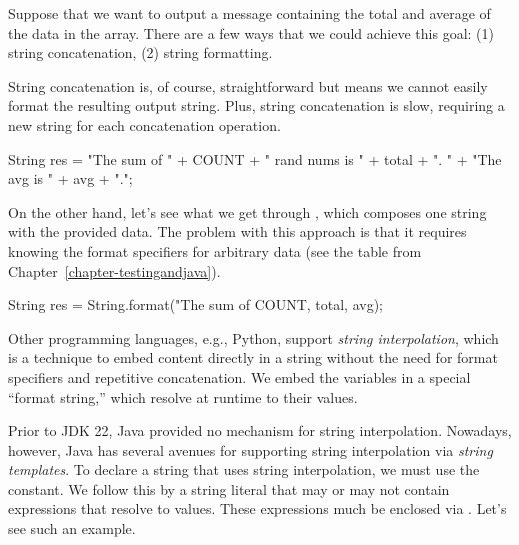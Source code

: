 Suppose that we want to output a message containing the total and average of the data in the  array. There are a few ways that we could achieve this goal: (1) string concatenation, (2) string formatting.

String concatenation is, of course, straightforward but means we cannot easily format the resulting output string. Plus, string concatenation is slow, requiring a new string for each concatenation operation.

\begin{verbnobox}[\small]
String res = "The sum of " + COUNT + " rand nums is " + total + ". "
             + "The avg is " + avg + ".";
\end{verbnobox}

On the other hand, let's see what we get through , which composes one string with the provided data. The problem with this approach is that it requires knowing the format specifiers for arbitrary data (see the table from Chapter~\ref{chapter-testingandjava}).

\begin{verbnobox}[\small]
String res = String.format("The sum of %
                           COUNT, total, avg);
\end{verbnobox}

Other programming languages, e.g., Python, support \emph{string interpolation}, which is a technique to embed content directly in a string without the need for format specifiers and repetitive concatenation. We embed the variables in a special ``format string,'' which resolve at runtime to their values.

Prior to JDK 22, Java provided no mechanism for string interpolation. Nowadays, however, Java has several avenues for supporting string interpolation via \emph{string templates}. To declare a string that uses string interpolation, we must use the  constant. We follow this by a string literal that may or may not contain expressions that resolve to values. These expressions much be enclosed via \ttt{\textbackslash$\{\}$}. Let's see such an example.

\begin{verbnobox}[\small]
String res = 
  STR."The sum of \{COUNT} rand nums is \{total}. The avg is \{avg}.";
\end{verbnobox}


